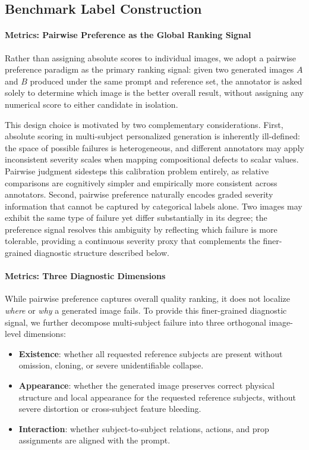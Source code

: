 \subsection{Benchmark Label Construction}

\paragraph{Metrics: Pairwise Preference as the Global Ranking Signal}
Rather than assigning absolute scores to individual images, we adopt a pairwise preference paradigm as the primary ranking signal: given two generated images $A$ and $B$ produced under the same prompt and reference set, the annotator is asked solely to determine which image is the better overall result, without assigning any numerical score to either candidate in isolation.

This design choice is motivated by two complementary considerations. First, absolute scoring in multi-subject personalized generation is inherently ill-defined: the space of possible failures is heterogeneous, and different annotators may apply inconsistent severity scales when mapping compositional defects to scalar values. Pairwise judgment sidesteps this calibration problem entirely, as relative comparisons are cognitively simpler and empirically more consistent across annotators. Second, pairwise preference naturally encodes graded severity information that cannot be captured by categorical labels alone. Two images may exhibit the same type of failure yet differ substantially in its degree; the preference signal resolves this ambiguity by reflecting which failure is more tolerable, providing a continuous severity proxy that complements the finer-grained diagnostic structure described below.

\paragraph{Metrics: Three Diagnostic Dimensions}
While pairwise preference captures overall quality ranking, it does not localize \textit{where} or \textit{why} a generated image fails. To provide this finer-grained diagnostic signal, we further decompose multi-subject failure into three orthogonal image-level dimensions:
\begin{itemize}
    \item \textbf{Existence}: whether all requested reference subjects are present without omission, cloning, or severe unidentifiable collapse.
    \item \textbf{Appearance}: whether the generated image preserves correct physical structure and local appearance for the requested reference subjects, without severe distortion or cross-subject feature bleeding.
    \item \textbf{Interaction}: whether subject-to-subject relations, actions, and prop assignments are aligned with the prompt.
\end{itemize}

